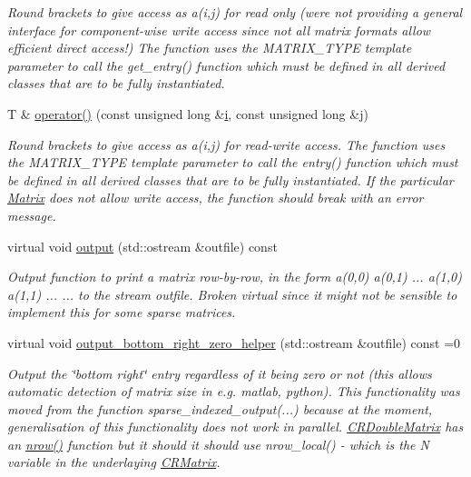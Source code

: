 \begin{DoxyCompactItemize}
\begin{DoxyCompactList}\small\item\em Round brackets to give access as a(i,j) for read only (we\textquotesingle{}re not providing a general interface for component-\/wise write access since not all matrix formats allow efficient direct access!) The function uses the M\+A\+T\+R\+I\+X\+\_\+\+T\+Y\+PE template parameter to call the get\+\_\+entry() function which must be defined in all derived classes that are to be fully instantiated. \end{DoxyCompactList}\item 
T \& \hyperlink{classoomph_1_1Matrix_a1601b48479c8fe38dd2d04600d7ebbae}{operator()} (const unsigned long \&\hyperlink{cfortran_8h_adb50e893b86b3e55e751a42eab3cba82}{i}, const unsigned long \&j)
\begin{DoxyCompactList}\small\item\em Round brackets to give access as a(i,j) for read-\/write access. The function uses the M\+A\+T\+R\+I\+X\+\_\+\+T\+Y\+PE template parameter to call the entry() function which must be defined in all derived classes that are to be fully instantiated. If the particular \hyperlink{classoomph_1_1Matrix}{Matrix} does not allow write access, the function should break with an error message. \end{DoxyCompactList}\item 
virtual void \hyperlink{classoomph_1_1Matrix_ace9b59cbe514c77f0b3816b144c740f6}{output} (std\+::ostream \&outfile) const
\begin{DoxyCompactList}\small\item\em Output function to print a matrix row-\/by-\/row, in the form a(0,0) a(0,1) ... a(1,0) a(1,1) ... ... to the stream outfile. Broken virtual since it might not be sensible to implement this for some sparse matrices. \end{DoxyCompactList}\item 
virtual void \hyperlink{classoomph_1_1Matrix_a10ee338f4d3893010291a692aea04248}{output\+\_\+bottom\+\_\+right\+\_\+zero\+\_\+helper} (std\+::ostream \&outfile) const =0
\begin{DoxyCompactList}\small\item\em Output the \char`\"{}bottom right\char`\"{} entry regardless of it being zero or not (this allows automatic detection of matrix size in e.\+g. matlab, python). This functionality was moved from the function sparse\+\_\+indexed\+\_\+output(...) because at the moment, generalisation of this functionality does not work in parallel. \hyperlink{classoomph_1_1CRDoubleMatrix}{C\+R\+Double\+Matrix} has an \hyperlink{classoomph_1_1Matrix_ac366ca5324d3e00e23d9800f3d5f4d5f}{nrow()} function but it should it should use nrow\+\_\+local() -\/ which is the N variable in the underlaying \hyperlink{classoomph_1_1CRMatrix}{C\+R\+Matrix}. \end{DoxyCompactList}\item 

\end{DoxyCompactItemize}
